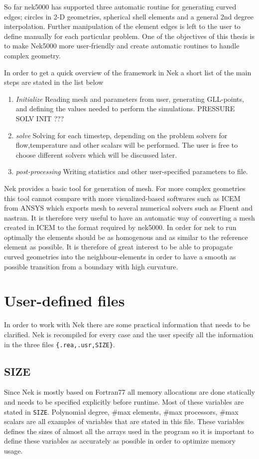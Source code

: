 So far nek5000 has supported three automatic routine for generating curved edges;
circles in 2-D geometries, spherical shell elements and a general 2nd degree interpolation.
Further manipulation of the element edges is left to the user to define manually
for each particular problem. One of the objectives of this thesis is to make Nek5000 more
user-friendly and create automatic routines to handle complex geometry.

In order to get a quick overview of the framework in Nek a short list of the main steps
are stated in the list below 

%
\begin{enumerate}
    \item \emph{Initialize} 
    \subitem Reading mesh and parameters from user, generating GLL-points, and defining
        the values needed to perform the simulations. PRESSURE SOLV INIT ??? 
    \item \emph{solve}
     \subitem Solving for each timestep, depending on the problem solvers for flow,temperature 
     and other scalars will be performed. The user is free to choose different solvers which 
     will be discussed later.
 \item \emph{post-processing}
     \subitem Writing statistics and other user-specified parameters to file.
\end{enumerate}
%
Nek provides a basic tool for generation of mesh. For more complex geometries this tool cannot compare with more visualized-based softwares 
such as ICEM from ANSYS which exports mesh to several numerical solvers such as Fluent and nastran.
It is therefore very useful to have an automatic way of converting a mesh created in ICEM to the format required by nek5000. 
In order for nek to run optimally the elements should be as homogenous and as similar to the reference element as possible. 
It is therefore of great interest to be able to propagate curved geometries into the neighbour-elements in order to have a smooth as 
possible transition from a boundary with high curvature.

\section{User-defined files}
In order to work with Nek there are some practical information that needs to be clarified.
Nek is recompiled for every case and the user specify all the information in the three files \verb|{.rea,.usr,SIZE}|.
%
\subsection{SIZE}
Since Nek is mostly based on Fortran77 all memory allocations are done statically and needs to be specified explicitly 
before runtime. Most of these variables are stated in \verb|SIZE|. Polynomial degree, \#max elements, \#max processors, 
\#max scalars are all examples of variables that are stated in this file. These variables defines the sizes of almost all 
the arrays used in the program so it is important to define these variables as accurately as possible in order to optimize
memory usage.
%
